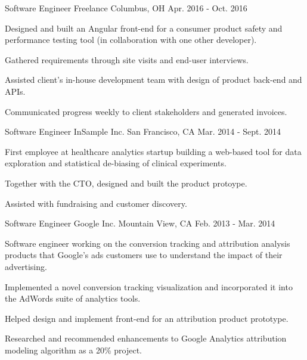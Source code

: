 \begin{cventries}
  \cventry
    {Software Engineer} %
    {Freelance} %
    {Columbus, OH} %
    {Apr. 2016 - Oct. 2016} %
    {
      \begin{cvitems} %
        \item {Designed and built an Angular front-end for a consumer product safety and performance testing tool (in collaboration with one other developer).}
        \item {Gathered requirements through site visits and end-user interviews.}
        \item {Assisted client's in-house development team with design of product back-end and APIs.}
        \item {Communicated progress weekly to client stakeholders and generated invoices.}
      \end{cvitems}
    }

  \cventry
    {Software Engineer} %
    {InSample Inc.} %
    {San Francisco, CA} %
    {Mar. 2014 - Sept. 2014} %
    {
      \begin{cvitems} %
        \item {First employee at healthcare analytics startup building a web-based tool for data exploration and statistical de-biasing of clinical experiments.}
        \item {Together with the CTO, designed and built the product protoype.}
        \item {Assisted with fundraising and customer discovery.}
      \end{cvitems}
    }

  \cventry
    {Software Engineer} %
    {Google Inc.} %
    {Mountain View, CA} %
    {Feb. 2013 - Mar. 2014} %
    {
      \begin{cvitems} %
        \item {Software engineer working on the conversion tracking and attribution analysis products that Google’s ads customers use to understand the impact of their advertising.}
        \item {Implemented a novel conversion tracking visualization and incorporated it into the AdWords suite of analytics tools.}
        \item {Helped design and implement front-end for an attribution product prototype.}
        \item {Researched and recommended enhancements to Google Analytics attribution modeling algorithm as a 20\% project.}
      \end{cvitems}
    }


\end{cventries}
